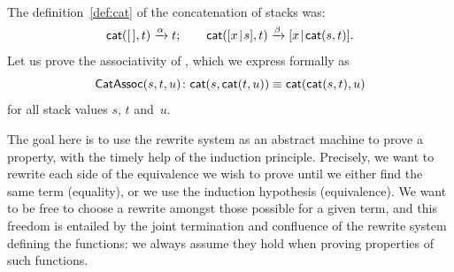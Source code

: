 The definition~\eqref{def:cat} of the concatenation of stacks was:
\begin{equation*}
\fun{cat}(        \el,t) \xrightarrow{\smash{\alpha}} t;\qquad
\fun{cat}(\cons{x}{s},t) \xrightarrow{\smash{\beta}}
\cons{x}{\fun{cat}(s,t)}.
\index{stack!concatenation!definition}
\end{equation*}
Let us prove the
associativity
 of , which
we express formally as
\begin{equation*}
  \pred{CatAssoc}{s,t,u} \colon
\fun{cat}(s,\fun{cat}(t,u)) \equiv
\fun{cat}(\fun{cat}(s,t),u)
\index{CatAssoc@\predName{CatAssoc}|(}
\end{equation*}
for all stack values \(s\), \(t\) and~\(u\).

The goal here is to use the rewrite system as an abstract machine to
prove a property, with the timely help of the induction
principle. Precisely, we want to rewrite each side of the equivalence
we wish to prove until we either find the same term (equality), or we
use the induction hypothesis (equivalence). We want to be free to
choose a rewrite amongst those possible for a given term, and this
freedom is entailed by the joint termination and confluence of the
rewrite system defining the functions: we always assume they hold when
proving properties of such functions.

